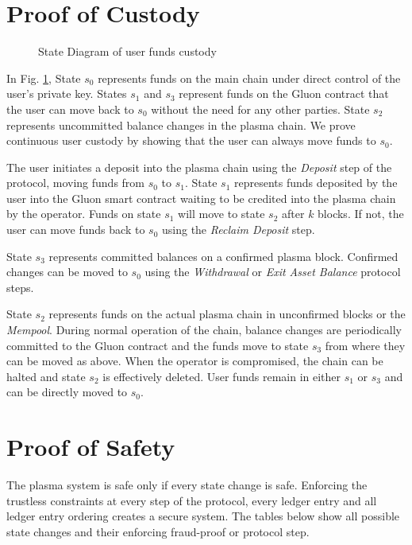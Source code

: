 \documentclass[12pt,a4paper]{article}
\begin{document}
\section{Proof of Custody}
\begin{figure}[ht]
    \centering

    \caption{State Diagram of user funds custody}
    \label{fig:custodystate}
\end{figure}

In Fig. \ref{fig:custodystate}, State $s_0$ represents funds on the main chain under direct control of the user's private key. States $s_1$ and $s_3$ represent funds on the Gluon contract that the user can move back to $s_0$ without the need for any other parties. State $s_2$ represents uncommitted balance changes in the plasma chain. We prove continuous user custody by showing that the user can always move funds to $s_0$.

The user initiates a deposit into the plasma chain using the \emph{Deposit} step of the protocol, moving funds from $s_0$ to $s_1$. State $s_1$ represents funds deposited by the user into the Gluon smart contract waiting to be credited into the plasma chain by the operator. Funds on state $s_1$ will move to state $s_2$ after $k$ blocks. If not, the user can move funds back to $s_0$ using the \emph{Reclaim Deposit} step.

State $s_3$ represents committed balances on a confirmed plasma block. Confirmed changes can be moved to $s_0$ using the \emph{Withdrawal} or \emph{Exit Asset Balance} protocol steps.

State $s_2$ represents funds on the actual plasma chain in unconfirmed blocks or the \emph{Mempool}. During normal operation of the chain, balance changes are periodically committed to the Gluon contract and the funds move to state $s_3$ from where they can be moved as above. When the operator is compromised, the chain can be halted and state $s_2$ is effectively deleted. User funds remain in either $s_1$ or $s_3$ and can be directly moved to $s_0$.


\newpage
\section{Proof of Safety}

The plasma system is safe only if every state change is safe. Enforcing the trustless constraints at every step of the protocol, every ledger entry and all ledger entry ordering creates a secure system. The tables below show all possible state changes and their enforcing fraud-proof or protocol step.
\end{document}
